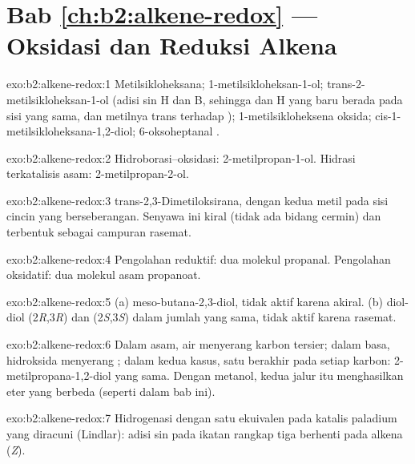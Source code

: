 \section*{Bab \ref{ch:b2:alkene-redox} --- Oksidasi dan Reduksi Alkena}

\begin{solution}{exo:b2:alkene-redox:1}
Metilsikloheksana; 1-metilsikloheksan-1-ol; trans-2-metilsikloheksan-1-ol
(adisi sin H dan B, sehingga  dan H yang baru berada pada sisi yang
sama, dan metilnya trans terhadap ); 1-metilsikloheksena oksida;
cis-1-metilsikloheksana-1,2-diol; 6-oksoheptanal
.
\end{solution}

\begin{solution}{exo:b2:alkene-redox:2}
Hidroborasi--oksidasi: 2-metilpropan-1-ol. Hidrasi terkatalisis asam:
2-metilpropan-2-ol.
\end{solution}

\begin{solution}{exo:b2:alkene-redox:3}
trans-2,3-Dimetiloksirana, dengan kedua metil pada sisi cincin yang
berseberangan. Senyawa ini kiral (tidak ada bidang cermin) dan terbentuk
sebagai campuran rasemat.
\end{solution}

\begin{solution}{exo:b2:alkene-redox:4}
Pengolahan reduktif: dua molekul propanal. Pengolahan oksidatif: dua molekul
asam propanoat.
\end{solution}

\begin{solution}{exo:b2:alkene-redox:5}
(a) meso-butana-2,3-diol, tidak aktif karena akiral. (b) diol-diol
(2\textit{R},3\textit{R}) dan (2\textit{S},3\textit{S}) dalam jumlah yang
sama, tidak aktif karena rasemat.
\end{solution}

\begin{solution}{exo:b2:alkene-redox:6}
Dalam asam, air menyerang karbon tersier; dalam basa, hidroksida menyerang
; dalam kedua kasus, satu  berakhir pada setiap karbon:
2-metilpropana-1,2-diol yang sama. Dengan metanol, kedua jalur itu
menghasilkan eter yang berbeda (seperti dalam bab ini).
\end{solution}

\begin{solution}{exo:b2:alkene-redox:7}
Hidrogenasi dengan satu ekuivalen  pada katalis paladium yang
diracuni (Lindlar): adisi sin pada ikatan rangkap tiga berhenti pada alkena
(\textit{Z}).
\end{solution}


